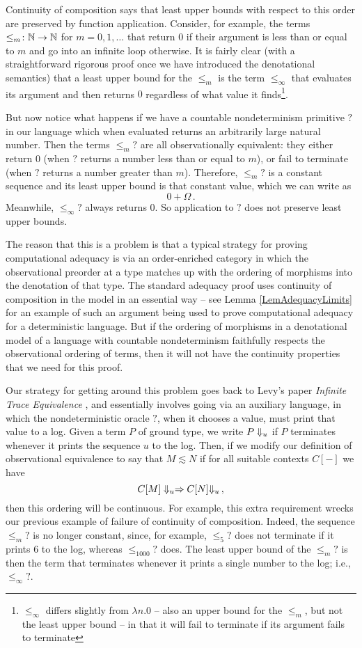 Continuity of composition says that least upper bounds with respect to this order are preserved by function application.  
Consider, for example, the terms $\le_m \colon \mathbb{N} \to \mathbb{N}$ for $m=0,1,\dots$ that return $0$ if their argument is less than or equal to $m$ and go into an infinite loop otherwise.
It is fairly clear (with a straightforward rigorous proof once we have introduced the denotational semantics) that a least upper bound for the $\le_m$ is the term $\le_\infty$ that evaluates its argument and then returns $0$ regardless of what value it finds\footnote{$\le_\infty$ differs slightly from $\lambda n.0$ -- also an upper bound for the $\le_m$, but not the least upper bound -- in that it will fail to terminate if its argument fails to terminate}.

But now notice what happens if we have a countable nondeterminism primitive $?$ in our language which when evaluated returns an arbitrarily large natural number.
Then the terms $\le_m ?$ are all observationally equivalent: they either return $0$ (when $?$ returns a number less than or equal to $m$), or fail to terminate (when $?$ returns a number greater than $m$).
Therefore, $\le_m?$ is a constant sequence and its least upper bound is that constant value, which we can write as
\[
  0+\Omega\,.
  \]
Meanwhile, $\le_\infty?$ always returns $0$.  
So application to $?$ does not preserve least upper bounds.

The reason that this is a problem is that a typical strategy for proving computational adequacy is via an order-enriched category in which the observational preorder at a type matches up with the ordering of morphisms into the denotation of that type.  
The standard adequacy proof uses continuity of composition in the model in an essential way -- see Lemma \ref{LemAdequacyLimits} for an example of such an argument being used to prove computational adequacy for a deterministic language.
But if the ordering of morphisms in a denotational model of a language with countable nondeterminism faithfully respects the observational ordering of terms, then it will not have the continuity properties that we need for this proof.

Our strategy for getting around this problem goes back to Levy's paper \emph{Infinite Trace Equivalence} \cite{LevyGsInfinite}, and essentially involves going via an auxiliary language, in which the nondeterministic oracle $?$, when it chooses a value, must print that value to a log.  
Given a term $P$ of ground type, we write $P\Downarrow_u$ if $P$ terminates whenever it prints the sequence $u$ to the log.  
Then, if we modify our definition of observational equivalence to say that $M\lesssim N$ if for all suitable contexts $C[-]$ we have
\[
  C[M] \Downarrow_u \mathrel{\Rightarrow C[N]} \Downarrow_u\,,
  \]
then this ordering will be continuous.  
For example, this extra requirement wrecks our previous example of failure of continuity of composition.  
Indeed, the sequence $\le_m ?$ is no longer constant, since, for example, $\le_5 ?$ does not terminate if it prints $6$ to the log, whereas $\le_{1000} ?$ does.
The least upper bound of the $\le_m?$ is then the term that terminates whenever it prints a single number to the log; i.e., $\le_\infty ?$.

